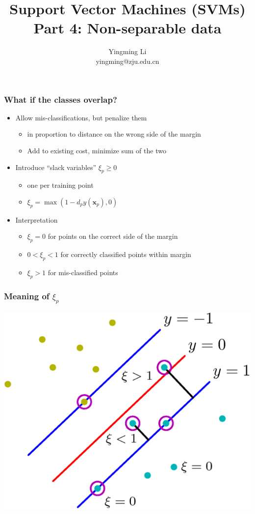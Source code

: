\documentclass[12pt,notes,mathserif]{beamer}
\title{ Support Vector Machines (SVMs)\\Part 4: Non-separable data}
\author[YingmingLi]{Yingming Li \\ yingming@zju.edu.cn}
\institute[DSERC, ZJU]{Data Science \& Engineering Research Center, ZJU}
\begin{document}

\begin{frame}[c]
	\titlepage
\end{frame}

\begin{frame}[c]
\frametitle{What if the classes overlap?}
\begin{itemize}
\item  Allow mis-classifications, but penalize them
\begin{itemize}
\item  in proportion to distance on the wrong side of the margin
\item  Add to existing cost, minimize sum of the two
\end{itemize}
\item Introduce ``slack variables'' $\xi_p\geqslant{}0$
\begin{itemize}
\item one per training point
\item $\xi_p=\max (1-d_py(\mathbf{x}_p),0)$
\end{itemize}
\item Interpretation
\begin{itemize}
\item $\xi_p=0$ for points on the correct side of the margin
\item $0<\xi_p < 1$ for correctly classified points within margin
\item $\xi_p>1$ for mis-classified points
\end{itemize}
\end{itemize}
\end{frame}


\begin{frame}[c]
\frametitle{Meaning of $\xi_p$}
\begin{center}
\includegraphics[width=0.7\linewidth]{fig10/lec113.jpg}
\end{center}
\end{frame}
\end{document}
